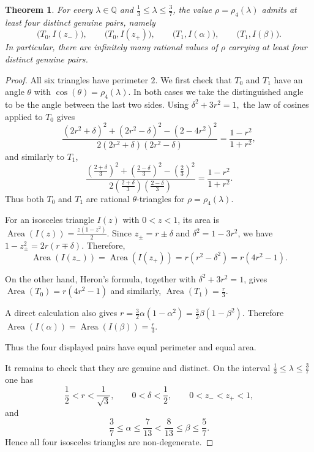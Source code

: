 \documentclass[10pt,a4paper]{amsart}
\newtheorem{thm}{Theorem}
\newcommand{\Q}{\mathbb{Q}}
\begin{document}
\begin{thm}\label{thm:four-pair-rational}
For every
$\lambda\in\Q$ and $\frac13\leq\lambda\leq\frac37$,
the value
$\rho=\rho_4(\lambda)$
admits at least four distinct genuine pairs, namely
\[
\bigl(T_0,I(z_-)\bigr),
\qquad
\bigl(T_0,I(z_+)\bigr),
\qquad
\bigl(T_1,I(\alpha)\bigr),
\qquad
\bigl(T_1,I(\beta)\bigr).
\]
In particular, there are infinitely many rational values of $\rho$
carrying at least four distinct genuine pairs.
\end{thm}

\begin{proof}
All six triangles have perimeter $2$. We first check that $T_0$ and
$T_1$ have an angle $\theta$ with
$\cos(\theta)=\rho_4(\lambda)$.
In both cases we take the distinguished angle to be the angle between
the last two sides. Using
$\delta^2+3r^2=1,$
the law of cosines applied to $T_0$ gives
\[
\frac{(2r^2+\delta)^2+(2r^2-\delta)^2-(2-4r^2)^2}
     {2(2r^2+\delta)(2r^2-\delta)}
=
\frac{1-r^2}{1+r^2},
\]
and similarly to $T_1$,
\[
\frac{\left(\frac{2+\delta}{3}\right)^2
      +\left(\frac{2-\delta}{3}\right)^2
      -\left(\frac23\right)^2}
     {2\left(\frac{2+\delta}{3}\right)
        \left(\frac{2-\delta}{3}\right)}
=
\frac{1-r^2}{1+r^2}.
\]
Thus both $T_0$ and $T_1$ are rational $\theta$-triangles for
$\rho=\rho_4(\lambda)$.

For an isosceles triangle $I(z)$ with $0<z<1$, its area is
$\operatorname{Area}(I(z)) = \frac{z(1-z^2)}{2}$.
Since
$z_\pm=r\pm\delta$
and $\delta^2=1-3r^2$, we have
$1-z_\pm^2 = 2r(r\mp\delta)$.
Therefore,
\[
\operatorname{Area}(I(z_-))
=
\operatorname{Area}(I(z_+))
=
r(r^2-\delta^2)
=
r(4r^2-1).
\]

On the other hand, Heron's formula, together with
$\delta^2+3r^2=1$, gives
$\operatorname{Area}(T_0)=r(4r^2-1)$ and similarly, $\operatorname{Area}(T_1) = \frac r3$.


A direct calculation also gives
$r = \frac32\alpha(1-\alpha^2) = \frac32\beta(1-\beta^2)$.
Therefore
$\operatorname{Area}(I(\alpha)) = \operatorname{Area}(I(\beta)) = \frac r3$.

Thus the four displayed pairs have equal perimeter and equal area.

It remains to check that they are genuine and distinct. On the interval
$\frac13\leq\lambda\leq\frac37$
one has
\[
\frac12<r<\frac1{\sqrt3},
\qquad
0<\delta<\frac12,
\qquad
0<z_-<z_+<1,
\]
and
\[
\frac37\leq \alpha\leq\frac7{13}
<
\frac8{13}\leq \beta\leq\frac57.
\]
Hence all four isosceles triangles are non-degenerate.


\end{proof}
\end{document}
